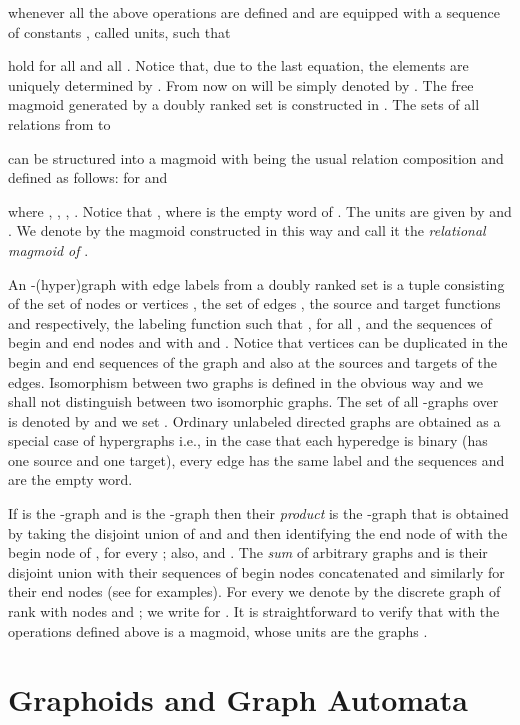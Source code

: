 \documentclass[runningheads,a4paper]{llncs}
\begin{document}
whenever all the above operations are defined and are equipped with a
sequence of constants ,  called units, such that

hold for all  and  all .
Notice that, due to the last equation, the elements  are uniquely determined by . From now on  will be
simply denoted by . The free magmoid  generated by a doubly ranked set  is constructed in \cite{BK1}. The sets  of all relations from  to 

can be structured into a magmoid with  being the usual
relation composition and  defined as follows: for  and 

where , , , . Notice that , where  is the empty word of . The units are given by
 and .
We denote by  the magmoid  constructed in this way and call it the \emph{relational magmoid of} .


 An -(hyper)graph  with edge labels from a doubly ranked set  is a tuple   consisting of the set of nodes or vertices , the set of edges ,   the source and target functions  and  respectively,    the labeling function  such that  , for all ,  and  the sequences of begin and end nodes  and  with  and . Notice that vertices can be duplicated in the begin and end sequences of the graph and also at the sources and targets of the edges. Isomorphism between two graphs is defined in the obvious way and we shall not distinguish between two isomorphic  graphs. The set of all  -graphs over  is
denoted by   and we set . Ordinary unlabeled directed graphs are obtained as a special case of hypergraphs i.e., in the case that each hyperedge is binary (has one source and one target), every edge has the same label and the sequences  and  are the empty word.

If  is the -graph   and  is the -graph   then their \emph{product}  is the -graph that is obtained by taking the disjoint union of  and  and then identifying
the  end node of  with the  begin node of , for every ; also,  and
. The \emph{sum}  of arbitrary graphs  and  is their disjoint union with their sequences of begin nodes concatenated and similarly for their end nodes (see \cite{BK3,Kal2} for examples). For every  we denote by  the discrete graph
of rank  with nodes  and ; we write  for .  It is straightforward to verify that  with the operations  defined above is a magmoid, whose units are the graphs .

\section{Graphoids and Graph Automata}\label{S:3}
\end{document}
